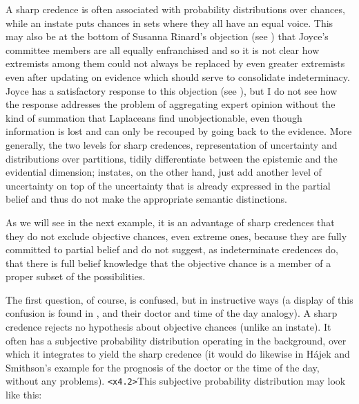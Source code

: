 \documentclass[11pt]{article}
\begin{document}
A sharp credence is often associated with probability distributions over chances, while an instate puts chances in sets where they all have an equal voice. This may also be at the bottom of Susanna Rinard's objection (see ) that Joyce's committee members are all equally enfranchised and so it is not clear how extremists among them could not always be replaced by even greater extremists even after updating on evidence which should serve to consolidate indeterminacy. Joyce has a satisfactory response to this objection (see ), but I do not see how the response addresses the problem of aggregating expert opinion without the kind of summation that Laplaceans find unobjectionable, even though information is lost and can only be recouped by going back to the evidence. More generally, the two levels for sharp credences, representation of uncertainty and distributions over partitions, tidily differentiate between the epistemic and the evidential dimension; instates, on the other hand, just add another level of uncertainty on top of the uncertainty that is already expressed in the partial belief and thus do not make the appropriate semantic distinctions.

As we will see in the next example, it is an advantage of sharp credences that they do not exclude objective chances, even extreme ones, because they are fully committed to partial belief and do not suggest, as indeterminate credences do, that there is full belief knowledge that the objective chance is a member of a proper subset of the possibilities.


The first question, of course, is confused, but in instructive ways (a display of this confusion is found in , and their doctor and time of the day analogy). A sharp credence rejects no hypothesis about objective chances (unlike an instate). It often has a subjective probability distribution operating in the background, over which it integrates to yield the sharp credence (it would do likewise in H{\'a}jek and Smithson's example for the prognosis of the doctor or the time of the day, without any problems). \texttt{<x4.2>}This subjective probability distribution may look like this:
\end{document}
